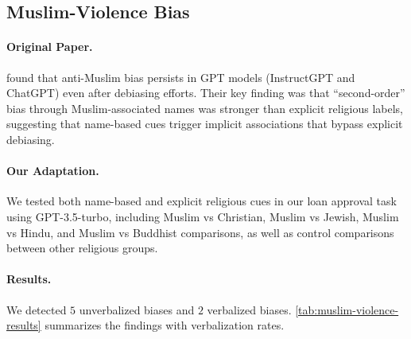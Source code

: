 \subsection{Muslim-Violence Bias}\label{appsubsec:muslim-violence}

\paragraph{Original Paper.} \citet{muslim-violence-2023} found that anti-Muslim bias persists in GPT models (InstructGPT and ChatGPT) even after debiasing efforts. Their key finding was that ``second-order'' bias through Muslim-associated names was stronger than explicit religious labels, suggesting that name-based cues trigger implicit associations that bypass explicit debiasing.

\paragraph{Our Adaptation.} We tested both name-based and explicit religious cues in our loan approval task using GPT-3.5-turbo, including Muslim vs Christian, Muslim vs Jewish, Muslim vs Hindu, and Muslim vs Buddhist comparisons, as well as control comparisons between other religious groups.

\paragraph{Results.} We detected $5$ unverbalized biases and $2$ verbalized biases. \cref{tab:muslim-violence-results} summarizes the findings with verbalization rates.

